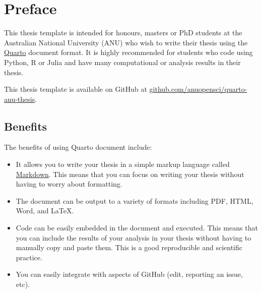 \documentclass[
  11pt,
  a4paper,
  twoside]{scrbook}
\providecommand{\tightlist}{%
  \setlength{\itemsep}{0pt}\setlength{\parskip}{0pt}}
\renewcommand*\contentsname{Table of contents}
\newcommand\contentsname{Table of contents}
\begin{document}

\renewcommand*\contentsname{Table of contents}
{
\setcounter{tocdepth}{2}
\tableofcontents
}
\listoffigures
\listoftables

\mainmatter
{}

\chapter*{Preface}\label{preface}


This thesis template is intended for honours, masters or PhD students at
the Australian National University (ANU) who wish to write their thesis
using the \href{https://quarto.org/}{Quarto} document format. It is
highly recommended for students who code using Python, R or Julia and
have many computational or analysis results in their thesis.

\begin{tcolorbox}[enhanced jigsaw, arc=.35mm, bottomrule=.15mm, bottomtitle=1mm, breakable, colback=white, colbacktitle=quarto-callout-note-color!10!white, colframe=quarto-callout-note-color-frame, coltitle=black, left=2mm, leftrule=.75mm, opacityback=0, opacitybacktitle=0.6, rightrule=.15mm, title=\textcolor{quarto-callout-note-color}{\faInfo}\hspace{0.5em}{Note}, titlerule=0mm, toprule=.15mm, toptitle=1mm]

This thesis template is available on GitHub at
\href{https://github.com/anuopensci/quarto-anu-thesis}{github.com/anuopensci/quarto-anu-thesis}.

\end{tcolorbox}

\section*{Benefits}\label{benefits}


The benefits of using Quarto document include:

\begin{itemize}
\tightlist
\item
  It allows you to write your thesis in a simple markup language called
  \href{https://www.markdownguide.org/}{Markdown}. This means that you
  can focus on writing your thesis without having to worry about
  formatting.
\item
  The document can be output to a variety of formats including PDF,
  HTML, Word, and LaTeX.
\item
  Code can be easily embedded in the document and executed. This means
  that you can include the results of your analysis in your thesis
  without having to manually copy and paste them. This is a good
  reproducible and scientific practice.
\item
  You can easily integrate with aspects of GitHub (edit, reporting an
  issue, etc).
\end{itemize}
\end{document}

